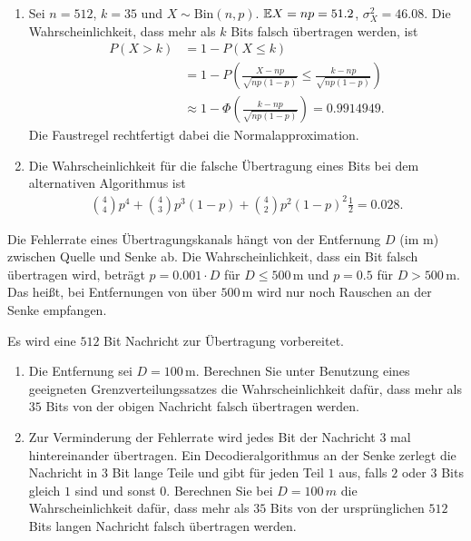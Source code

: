 \solution
\begin{enumerate}
    \item Sei $n=512$, $k=35$ und $X \sim \text{Bin}(n,
        p)$. $\mathbb{E} X = np= 51.2$, $\sigma^{2}_{X} = 46.08$. Die Wahrscheinlichkeit,
        dass mehr als $k$ Bits falsch übertragen werden, ist 
        \begin{align*}
            P\left( X > k \right) &= 1 - P\left( X \leq k \right) \\
            &= 1- P\left( \frac{X - np}{\sqrt{np(1-p)}} \leq \frac{k -np}{ \sqrt{np(1-p)}} \right) \\
            &\approx 1 - \Phi\left( \frac{k -np}{ \sqrt{np(1-p)}}  \right) =  0.9914949.
        \end{align*}
        Die Faustregel rechtfertigt dabei die Normalapproximation. 
    \item Die Wahrscheinlichkeit für die falsche Übertragung eines Bits bei dem alternativen 
        Algorithmus ist 
        \begin{align*}
            \binom{4}{4} p^{4} + \binom{4}{3} p^{3}(1-p) + \binom{4}{2} p^2 (1-p)^{2} \frac{1}{2} = 0.028.
        \end{align*}
\end{enumerate}



 Die Fehlerrate eines Übertragungskanals hängt
von der Entfernung $D$ (im m) zwischen Quelle und Senke ab. Die
Wahrscheinlichkeit, dass ein Bit falsch übertragen wird, beträgt $p =
0.001\cdot{} D$ für $D\leq 500\,\text{m}$ und $p=0.5$ für $D>500\,\text{m}$.
Das heißt, bei Entfernungen von über $500\,\text{m}$ wird nur noch Rauschen an
der Senke empfangen.

Es wird eine $512$ Bit Nachricht zur Übertragung vorbereitet.  
\begin{enumerate}
    \item Die Entfernung sei $D=100\,$m. Berechnen Sie unter Benutzung eines
        geeigneten Grenzverteilungssatzes die Wahrscheinlichkeit dafür, dass
        mehr als $35$ Bits von der obigen Nachricht falsch übertragen werden. 

    \item Zur Verminderung der Fehlerrate wird jedes Bit der Nachricht $3$ mal
        hintereinander übertragen. Ein Decodieralgorithmus an der Senke zerlegt
        die Nachricht in $3$ Bit lange Teile und gibt für jeden Teil $1$ aus,
        falls $2$ oder $3$ Bits gleich $1$ sind und sonst $0$. Berechnen Sie
        bei $D=100\,m$ die Wahrscheinlichkeit dafür, dass mehr als $35$ Bits
        von der ursprünglichen $512$ Bits langen Nachricht falsch übertragen
        werden.

\end{enumerate}

